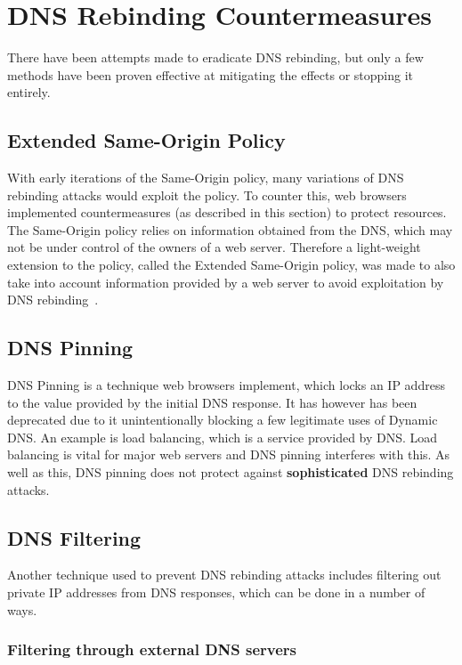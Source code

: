 \chapter{DNS Rebinding Countermeasures}

There have been attempts made to eradicate DNS rebinding, but only
a few methods have been proven effective at mitigating the effects
or stopping it entirely.

\section{Extended Same-Origin Policy}

With early iterations of the Same-Origin policy, many variations of
DNS rebinding attacks would exploit the policy. To counter this, web
browsers implemented countermeasures (as described in this section) to
protect resources. The Same-Origin policy relies on information
obtained from the DNS, which may not be under control of the owners
of a web server. Therefore a light-weight extension to the policy,
called the Extended Same-Origin policy, was made to also take into
account information provided by a web server to avoid exploitation by
DNS rebinding~\cite{johns2013eradicating}.

\section{DNS Pinning}

DNS Pinning is a technique web browsers implement, which locks an IP
address to the value provided by the initial DNS response. It has
however has been deprecated due to it unintentionally blocking a
few legitimate uses of Dynamic DNS. An example is load balancing,
which is a service provided by DNS. Load balancing is vital for
major web servers and DNS pinning interferes with this. As well as
this, DNS pinning does not protect against \textbf{sophisticated}
DNS rebinding attacks.

\section{DNS Filtering}

Another technique used to prevent DNS rebinding attacks includes
filtering out private IP addresses from DNS responses, which can be
done in a number of ways.

\subsection{Filtering through external DNS servers}

